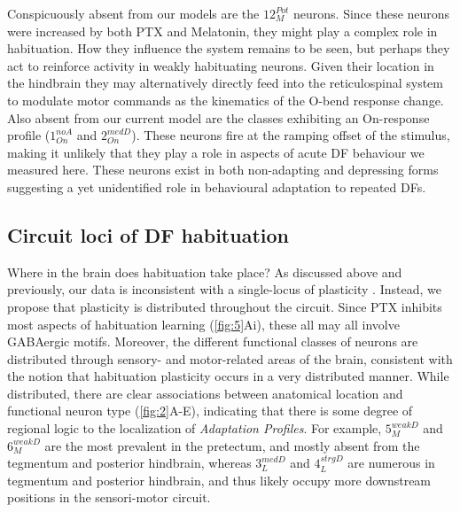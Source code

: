 \documentclass[9pt,lineno]{RandlettLab_elife}
\begin{document}
Conspicuously absent from our models are the $12_{M}^{Pot}$ neurons. Since these neurons were increased by both PTX and Melatonin, they might play a complex role in habituation. How they influence the system remains to be seen, but perhaps they act to reinforce activity in weakly habituating neurons. Given their location in the  hindbrain they may alternatively directly feed into the reticulospinal system to modulate motor commands as the kinematics of the O-bend response change. Also absent from our current model are the classes exhibiting an On-response profile ($1_{On}^{noA}$ and $2_{On}^{medD}$). These neurons fire at the ramping offset of the stimulus, making it unlikely that they play a role in aspects of acute DF behaviour we measured here. These neurons exist in both non-adapting and depressing forms suggesting a yet unidentified role in behavioural adaptation to repeated DFs. 

\subsection{Circuit loci of DF habituation}

Where in the brain does habituation take place?  As discussed above and previously, our data is inconsistent with a single-locus of plasticity \citep{Randlett2019-fi}. Instead, we propose that plasticity is distributed throughout the circuit. Since PTX inhibits most aspects of habituation learning (\autoref{fig:5}Ai), these all may all involve GABAergic motifs. Moreover, the different functional classes of neurons are distributed through sensory- and motor-related areas of the brain, consistent with the notion that habituation plasticity occurs in a very distributed manner. While distributed, there are clear associations between anatomical location and functional neuron type (\autoref{fig:2}A-E), indicating that there is some degree of regional logic to the localization of \emph{Adaptation Profiles}. For example, $5_{M}^{weakD}$ and $6_{M}^{weakD}$ are the most prevalent in the pretectum, and mostly absent from the tegmentum and posterior hindbrain, whereas $3_{L}^{medD}$ and $4_{L}^{strgD}$ are numerous in tegmentum and posterior hindbrain, and thus likely occupy more downstream positions in the sensori-motor circuit. 
\end{document}
